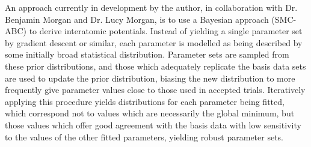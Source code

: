 An approach currently in development by the author, in collaboration with Dr. Benjamin Morgan and Dr. Lucy Morgan, is to use a Bayesian approach (SMC-ABC\cite{Toni2009a}) to derive interatomic potentials.
Instead of yielding a single parameter set by gradient descent or similar, each parameter is modelled as being described by some initially broad statistical distribution.
Parameter sets are sampled from these prior distributions, and those which adequately replicate the basis data sets are used to update the prior distribution, biasing the new distribution to more frequently give parameter values close to those used in accepted trials.
Iteratively applying this procedure yields distributions for each parameter being fitted, which correspond not to values which are necessarily the global minimum, but those values which offer good agreement with the basis data with low sensitivity to the values of the other fitted parameters, yielding robust parameter sets.

